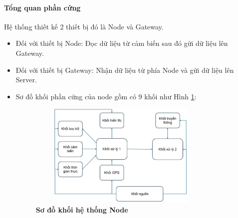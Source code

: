 \documentclass{article} %
\begin{document}
	\paragraph{Tổng quan phần cứng}\mbox{}
	
	Hệ thống thiết kế 2 thiết bị đó là Node và Gateway.
	
	\begin{itemize}[label=$\ast$]
		\item Đối với thiết bị Node: Đọc dữ liệu từ cảm biến sau đó gửi dữ liệu lên Gateway.
		\item Đối với thiết bị Gateway: Nhận dữ liệu từ phía Node và gửi dữ liệu lên Server.
	\end{itemize}
	
	\begin{itemize}
		\item  Sơ đồ khối phần cứng của node gồm có 9 khối như Hình \ref{Node}:
		
		\begin{figure}[!ht]
			\centering
			\includegraphics[width=9cm,height=5cm]{Images/Node.png}
			\caption[Sơ đồ khối hệ thống Node]{\bfseries \fontsize{12pt}{0pt}\selectfont Sơ đồ khối hệ thống Node}
			\label{Node}
		\end{figure}
		

\end{itemize}
\end{document}
